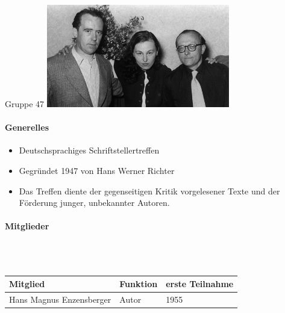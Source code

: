 \documentclass[12pt,a4paper]{report}
\begin{document}
	
	\Huge Gruppe 47
	\hspace{2cm}
	\includegraphics[width=8cm]{IMG_1745.jpeg}

	\vspace{1cm}
	\normalsize
	
	\paragraph{Generelles}
	
	\begin{itemize}
		\item Deutschsprachiges Schriftstellertreffen
		\item Gegründet 1947 von Hans Werner Richter
		\item Das Treffen diente der gegenseitigen Kritik vorgelesener Texte und der Förderung junger, unbekannter Autoren.
	\end{itemize}
	
	\paragraph{Mitglieder} \mbox{} \\\\
	\begin{tabularx}{\textwidth}{|X|X|X|}
		\hline
		\textbf{Mitglied} & \textbf{Funktion} & \textbf{erste Teilnahme} \\
		\hline
		Hans Magnus Enzensberger & Autor & 1955 \\
		
	\end{tabularx}
	

	
\end{document}
